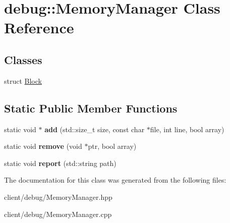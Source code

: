 \hypertarget{classdebug_1_1_memory_manager}{\section{debug\-:\-:Memory\-Manager Class Reference}
\label{classdebug_1_1_memory_manager}
}
\subsection*{Classes}
\begin{DoxyCompactItemize}
\item 
struct \hyperlink{structdebug_1_1_memory_manager_1_1_block}{Block}
\end{DoxyCompactItemize}
\subsection*{Static Public Member Functions}
\begin{DoxyCompactItemize}
\item 
\hypertarget{classdebug_1_1_memory_manager_a9a006653a572c1d3a2688242f042f7f2}{static void $\ast$ {\bfseries add} (std\-::size\-\_\-t size, const char $\ast$file, int line, bool array)}\label{classdebug_1_1_memory_manager_a9a006653a572c1d3a2688242f042f7f2}

\item 
\hypertarget{classdebug_1_1_memory_manager_ab403b14e8472d9d3932115df31a23ccd}{static void {\bfseries remove} (void $\ast$ptr, bool array)}\label{classdebug_1_1_memory_manager_ab403b14e8472d9d3932115df31a23ccd}

\item 
\hypertarget{classdebug_1_1_memory_manager_a4f1084bfffa0e38f8fb277ba94bb4e1a}{static void {\bfseries report} (std\-::string path)}\label{classdebug_1_1_memory_manager_a4f1084bfffa0e38f8fb277ba94bb4e1a}

\end{DoxyCompactItemize}


The documentation for this class was generated from the following files\-:\begin{DoxyCompactItemize}
\item 
client/debug/Memory\-Manager.\-hpp\item 
client/debug/Memory\-Manager.\-cpp\end{DoxyCompactItemize}

